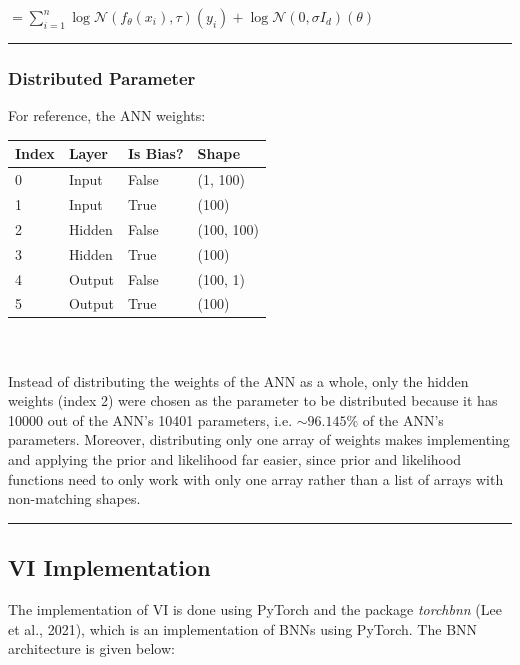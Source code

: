 \documentclass[conference]{IEEEtran}
\begin{document}
$\displaystyle = \sum_{i=1}^n \log \mathcal{N}(f_\theta(x_i), \tau)(y_i) + \log \mathcal{N}(0, \sigma I_d)(\theta)$\\

\par\noindent\rule{0.49\textwidth}{0.1pt}

\subsubsection{Distributed Parameter}
For reference, the ANN weights:\\

\begin{tabular}{| m{1.5cm} | m{1.5cm} | m{1.5cm} | m{1.5cm} |}
    \hline
    \textbf{Index} & \textbf{Layer} & \textbf{Is Bias?}& \textbf{Shape}\\
    \hline
    0 & Input & False & (1, 100)\\
    \hline
    1 & Input & True & (100)\\
    \hline
    2 & Hidden & False & (100, 100)\\
    \hline
    3 & Hidden & True & (100)\\
    \hline
    4 & Output & False & (100, 1)\\
    \hline
    5 & Output & True & (100)\\
    \hline
\end{tabular}\\~\\

Instead of distributing the weights of the ANN as a whole, only the hidden weights (index 2) were chosen as the parameter to be distributed because it has 10000 out of the ANN's 10401 parameters, i.e. $\sim 96.145\%$ of the ANN's parameters. Moreover, distributing only one array of weights makes implementing and applying the prior and likelihood far easier, since prior and likelihood functions need to only work with only one array rather than a list of arrays with non-matching shapes.\\

\par\noindent\rule{0.49\textwidth}{0.1pt}

\subsection{VI Implementation}
The implementation of VI is done using PyTorch and the package \textit{torchbnn} (Lee et al., 2021), which is an implementation of BNNs using PyTorch. The BNN architecture is given below:\\
\end{document}
